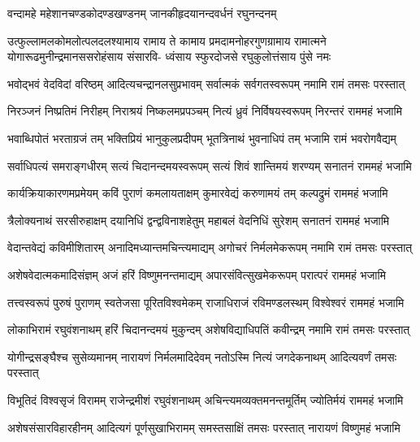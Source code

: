 \twolineshloka
{वन्दामहे महेशानचण्डकोदण्डखण्डनम्}
{जानकीहृदयानन्दवर्धनं रघुनन्दनम्}%

\fourlineindentedshloka
{उत्फुल्लामलकोमलोत्पलदलश्यामाय रामाय ते} 
{कामाय प्रमदामनोहरगुणग्रामाय रामात्मने}
{योगारूढमुनीन्द्रमानससरोहंसाय संसारवि-}
{ध्वंसाय स्फुरदोजसे रघुकुलोत्तंसाय पुंसे नमः}%

\fourlineindentedshloka
{भवोद्भवं वेदविदां वरिष्ठम्}
{आदित्यचन्द्रानलसुप्रभावम्}
{सर्वात्मकं सर्वगतस्वरूपम्}
{नमामि रामं तमसः परस्तात्}%

\fourlineindentedshloka
{निरञ्जनं निष्प्रतिमं निरीहम्} 
{निराश्रयं निष्कलमप्रपञ्चम्}
{नित्यं ध्रुवं निर्विषयस्वरूपम्}
{निरन्तरं राममहं भजामि}%

\fourlineindentedshloka
{भवाब्धिपोतं भरताग्रजं तम्} 
{भक्तिप्रियं भानुकुलप्रदीपम्}
{भूतत्रिनाथं भुवनाधिपं तम्}
{भजामि रामं भवरोगवैद्यम्}%

\fourlineindentedshloka
{सर्वाधिपत्यं समराङ्गधीरम्} 
{सत्यं चिदानन्दमयस्वरूपम्}
{सत्यं शिवं शान्तिमयं शरण्यम्}
{सनातनं राममहं भजामि}%

\fourlineindentedshloka
{कार्यक्रियाकारणमप्रमेयम्} 
{कविं पुराणं कमलायताक्षम्}
{कुमारवेद्यं करुणामयं तम्}
{कल्पद्रुमं राममहं भजामि}%

\fourlineindentedshloka
{त्रैलोक्यनाथं सरसीरुहाक्षम्} 
{दयानिधिं द्वन्द्वविनाशहेतुम्}
{महाबलं वेदनिधिं सुरेशम्}
{सनातनं राममहं भजामि}%

\fourlineindentedshloka
{वेदान्तवेद्यं कविमीशितारम्}
{अनादिमध्यान्तमचिन्त्यमाद्यम्}
{अगोचरं निर्मलमेकरूपम्}
{नमामि रामं तमसः परस्तात्}%

\fourlineindentedshloka
{अशेषवेदात्मकमादिसंज्ञम्} 
{अजं हरिं विष्णुमनन्तमाद्यम्}
{अपारसंवित्सुखमेकरूपम्}
{परात्परं राममहं भजामि}%

\fourlineindentedshloka
{तत्त्वस्वरूपं पुरुषं पुराणम्} 
{स्वतेजसा पूरितविश्वमेकम्}
{राजाधिराजं रविमण्डलस्थम्}
{विश्वेश्वरं राममहं भजामि}%

\fourlineindentedshloka
{लोकाभिरामं रघुवंशनाथम्} 
{हरिं चिदानन्दमयं मुकुन्दम्}
{अशेषविद्याधिपतिं कवीन्द्रम्}
{नमामि रामं तमसः परस्तात्}%

\fourlineindentedshloka
{योगीन्द्रसङ्घैश्च सुसेव्यमानम्} 
{नारायणं निर्मलमादिदेवम्}
{नतोऽस्मि नित्यं जगदेकनाथम्}
{आदित्यवर्णं तमसः परस्तात्}%

\fourlineindentedshloka
{विभूतिदं विश्वसृजं विरामम्} 
{राजेन्द्रमीशं रघुवंशनाथम्}
{अचिन्त्यमव्यक्तमनन्तमूर्तिम्}
{ज्योतिर्मयं राममहं भजामि}%

\fourlineindentedshloka
{अशेषसंसारविहारहीनम्}
{आदित्यगं पूर्णसुखाभिरामम्}
{समस्तसाक्षिं तमसः परस्तात्}
{नारायणं विष्णुमहं भजामि}%

